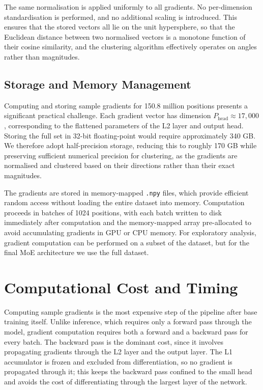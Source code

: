 The same normalisation is applied uniformly to all gradients. No per-dimension standardisation is performed, and no additional scaling is introduced. This ensures that the stored vectors all lie on the unit hypersphere, so that the Euclidean distance between two normalised vectors is a monotone function of their cosine similarity, and the clustering algorithm effectively operates on angles rather than magnitudes.

\subsection{Storage and Memory Management}

Computing and storing sample gradients for 150.8 million positions presents a significant practical challenge. Each gradient vector has dimension $P_{\text{head}} \approx 17,000$, corresponding to the flattened parameters of the L2 layer and output head. Storing the full set in 32-bit floating-point would require approximately 340 GB. We therefore adopt half-precision storage, reducing this to roughly 170 GB while preserving sufficient numerical precision for clustering, as the gradients are normalised and clustered based on their directions rather than their exact magnitudes.

The gradients are stored in memory-mapped \texttt{.npy} files, which provide efficient random access without loading the entire dataset into memory. Computation proceeds in batches of 1024 positions, with each batch written to disk immediately after computation and the memory-mapped array pre-allocated to avoid accumulating gradients in GPU or CPU memory. For exploratory analysis, gradient computation can be performed on a subset of the dataset, but for the final MoE architecture we use the full dataset.


\section{Computational Cost and Timing}

Computing sample gradients is the most expensive step of the pipeline after base training itself. Unlike inference, which requires only a forward pass through the model, gradient computation requires both a forward and a backward pass for every batch. The backward pass is the dominant cost, since it involves propagating gradients through the L2 layer and the output layer. The L1 accumulator is frozen and excluded from differentiation, so no gradient is propagated through it; this keeps the backward pass confined to the small head and avoids the cost of differentiating through the largest layer of the network.

